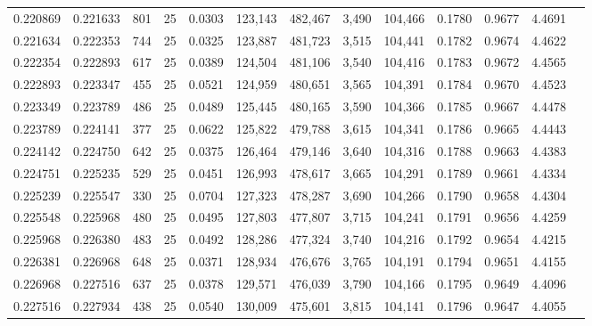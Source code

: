 \begin{tabular}{rrrrrrrrrrrrr}
0.220869 & 0.221633 &   801 &  25 &                                     0.0303 & 123,143 & 482,467 &   3,490 & 104,466 & 0.1780 & 0.9677 & 4.4691 \\
0.221634 & 0.222353 &   744 &  25 &                                     0.0325 & 123,887 & 481,723 &   3,515 & 104,441 & 0.1782 & 0.9674 & 4.4622 \\
0.222354 & 0.222893 &   617 &  25 &                                     0.0389 & 124,504 & 481,106 &   3,540 & 104,416 & 0.1783 & 0.9672 & 4.4565 \\
0.222893 & 0.223347 &   455 &  25 &                                     0.0521 & 124,959 & 480,651 &   3,565 & 104,391 & 0.1784 & 0.9670 & 4.4523 \\
0.223349 & 0.223789 &   486 &  25 &                                     0.0489 & 125,445 & 480,165 &   3,590 & 104,366 & 0.1785 & 0.9667 & 4.4478 \\
0.223789 & 0.224141 &   377 &  25 &                                     0.0622 & 125,822 & 479,788 &   3,615 & 104,341 & 0.1786 & 0.9665 & 4.4443 \\
0.224142 & 0.224750 &   642 &  25 &                                     0.0375 & 126,464 & 479,146 &   3,640 & 104,316 & 0.1788 & 0.9663 & 4.4383 \\
0.224751 & 0.225235 &   529 &  25 &                                     0.0451 & 126,993 & 478,617 &   3,665 & 104,291 & 0.1789 & 0.9661 & 4.4334 \\
0.225239 & 0.225547 &   330 &  25 &                                     0.0704 & 127,323 & 478,287 &   3,690 & 104,266 & 0.1790 & 0.9658 & 4.4304 \\
0.225548 & 0.225968 &   480 &  25 &                                     0.0495 & 127,803 & 477,807 &   3,715 & 104,241 & 0.1791 & 0.9656 & 4.4259 \\
0.225968 & 0.226380 &   483 &  25 &                                     0.0492 & 128,286 & 477,324 &   3,740 & 104,216 & 0.1792 & 0.9654 & 4.4215 \\
0.226381 & 0.226968 &   648 &  25 &                                     0.0371 & 128,934 & 476,676 &   3,765 & 104,191 & 0.1794 & 0.9651 & 4.4155 \\
0.226968 & 0.227516 &   637 &  25 &                                     0.0378 & 129,571 & 476,039 &   3,790 & 104,166 & 0.1795 & 0.9649 & 4.4096 \\
0.227516 & 0.227934 &   438 &  25 &                                     0.0540 & 130,009 & 475,601 &   3,815 & 104,141 & 0.1796 & 0.9647 & 4.4055 \\

\end{tabular}
